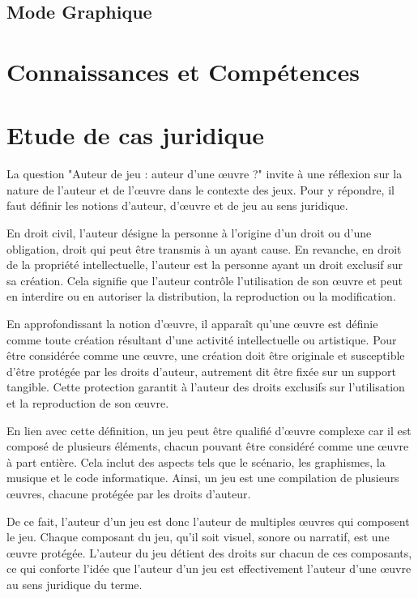 \subsection*{Mode Graphique}

\section{Connaissances et Compétences}

\section{Etude de cas juridique}

La question "Auteur de jeu : auteur d'une œuvre ?" invite à une réflexion sur la nature de l'auteur et de l'œuvre dans le contexte des jeux. Pour y répondre, il faut définir les notions d'auteur, d'œuvre et de jeu au sens juridique.

En droit civil, l'auteur désigne la personne à l'origine d'un droit ou d'une obligation, droit qui peut être transmis à un ayant cause. En revanche, en droit de la propriété intellectuelle, l'auteur est la personne ayant un droit exclusif sur sa création. Cela signifie que l'auteur contrôle l'utilisation de son œuvre et peut en interdire ou en autoriser la distribution, la reproduction ou la modification.

En approfondissant la notion d'œuvre, il apparaît qu'une œuvre est définie comme toute création résultant d'une activité intellectuelle ou artistique. Pour être considérée comme une œuvre, une création doit être originale et susceptible d'être protégée par les droits d'auteur, autrement dit être fixée sur un support tangible. Cette protection garantit à l'auteur des droits exclusifs sur l'utilisation et la reproduction de son œuvre.

En lien avec cette définition, un jeu peut être qualifié d'œuvre complexe car il est composé de plusieurs éléments, chacun pouvant être considéré comme une œuvre à part entière. Cela inclut des aspects tels que le scénario, les graphismes, la musique et le code informatique. Ainsi, un jeu est une compilation de plusieurs œuvres, chacune protégée par les droits d'auteur.

De ce fait, l'auteur d'un jeu est donc l'auteur de multiples œuvres qui composent le jeu. Chaque composant du jeu, qu'il soit visuel, sonore ou narratif, est une œuvre protégée. L'auteur du jeu détient des droits sur chacun de ces composants, ce qui conforte l'idée que l'auteur d'un jeu est effectivement l'auteur d'une œuvre au sens juridique du terme.

